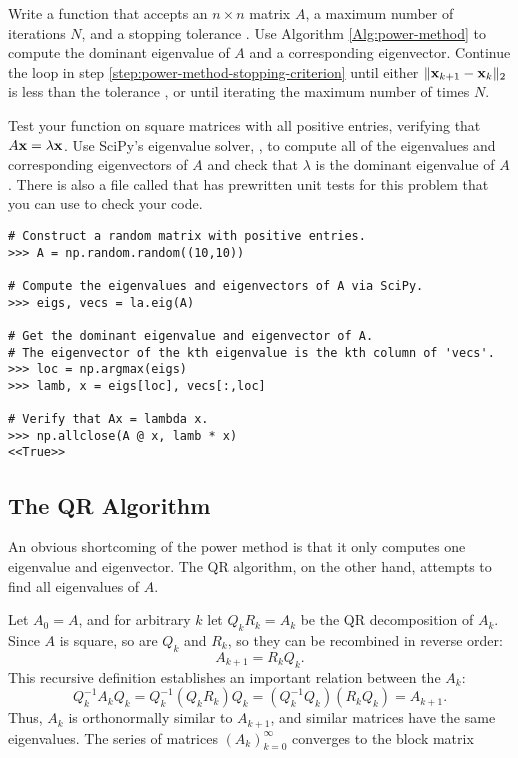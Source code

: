 \begin{problem} %
Write a function that accepts an $n \times n$ matrix $A$, a maximum number of iterations $N$, and a stopping tolerance .
Use Algorithm \ref{Alg:power-method} to compute the dominant eigenvalue of $A$ and a corresponding eigenvector.
Continue the loop in step \ref{step:power-method-stopping-criterion} until either $\|\mathbf{x}_{k+1} - \mathbf{x}_k\|_2$ is less than the tolerance , or until iterating the maximum number of times $N$.

Test your function on square matrices with all positive entries, verifying that $A\mathbf{x} = \lambda\mathbf{x}$.
Use SciPy's eigenvalue solver, , to compute all of the eigenvalues and corresponding eigenvectors of $A$ and check that $\lambda$ is the dominant eigenvalue of $A$. There is also a file called  that has prewritten unit tests for this problem that you can use to check your code.

\begin{lstlisting}
# Construct a random matrix with positive entries.
>>> A = np.random.random((10,10))

# Compute the eigenvalues and eigenvectors of A via SciPy.
>>> eigs, vecs = la.eig(A)

# Get the dominant eigenvalue and eigenvector of A.
# The eigenvector of the kth eigenvalue is the kth column of 'vecs'.
>>> loc = np.argmax(eigs)
>>> lamb, x = eigs[loc], vecs[:,loc]

# Verify that Ax = lambda x.
>>> np.allclose(A @ x, lamb * x)
<<True>>
\end{lstlisting}
\end{problem}

\subsection*{The QR Algorithm} %

An obvious shortcoming of the power method is that it only computes one eigenvalue and eigenvector.
The QR algorithm, on the other hand, attempts to find all eigenvalues of $A$.

Let $A_0 = A$, and for arbitrary $k$ let $Q_kR_k = A_k$ be the QR decomposition of $A_k$.
Since $A$ is square, so are $Q_k$ and $R_k$, so they can be recombined in reverse order:
\[A_{k+1}=R_kQ_k.\]
This recursive definition establishes an important relation between the $A_k$:
\[Q_k^{-1}A_kQ_k = Q_k^{-1}(Q_kR_k)Q_k = (Q_k^{-1}Q_k)(R_kQ_k) = A_{k+1}.\]
Thus, $A_k$ is orthonormally similar to $A_{k+1}$, and similar matrices have the same eigenvalues.
The series of matrices $(A_k)_{k=0}^\infty$ converges to the block matrix

